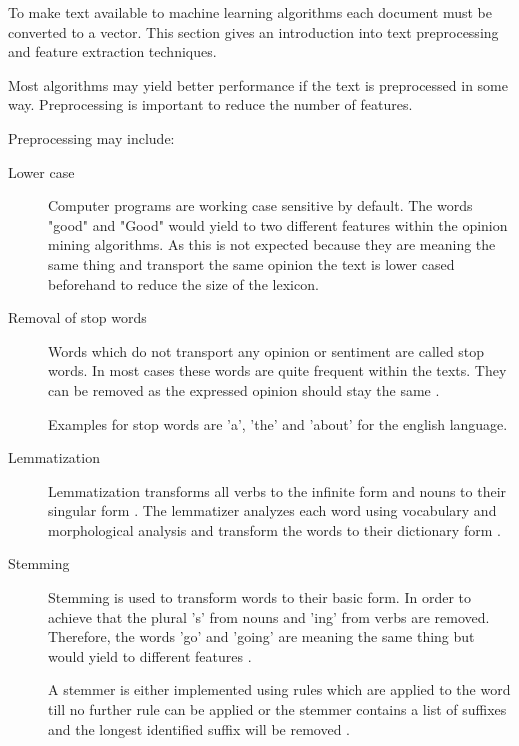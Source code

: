 To make text available to machine learning algorithms each document must be converted to a vector.
This section gives an introduction into text preprocessing and feature extraction techniques.


Most algorithms may yield better performance if the text is preprocessed in some way.
Preprocessing is important to reduce the number of features.

Preprocessing may include:

\begin{description}
	\item [Lower case]
		Computer programs are working case sensitive by default.
		The words "good" and "Good" would yield to two different features within the opinion mining algorithms.
		As this is not expected because they are meaning the same thing and transport the same opinion the text is lower cased beforehand to reduce the size of the lexicon.

	\item [Removal of stop words]
		Words which do not transport any opinion or sentiment are called stop words.
		In most cases these words are quite frequent within the texts.
		They can be removed as the expressed opinion should stay the same
		\cite{Nothman2018}.

		Examples for stop words are 'a', 'the' and 'about' for the english language.

	\item [Lemmatization]
		Lemmatization transforms all verbs to the infinite form and nouns to their singular form 
		\cite{Shukri2015a}.
		The lemmatizer analyzes each word using vocabulary and morphological analysis and transform the words to their dictionary form
		\cite{Balakrishnan2014}.
 
	\item [Stemming]
		Stemming is used to transform words to their basic form.
		In order to achieve that the plural 's' from nouns and 'ing' from verbs are removed.
		Therefore, the words 'go' and 'going' are meaning the same thing but would yield to different features
		\cite{Shukri2015a}.

		A stemmer is either implemented using rules which are applied to the word till no further rule can be applied or the stemmer contains a list of suffixes and the longest identified suffix will be removed
		\cite{Balakrishnan2014}.
\end{description}

